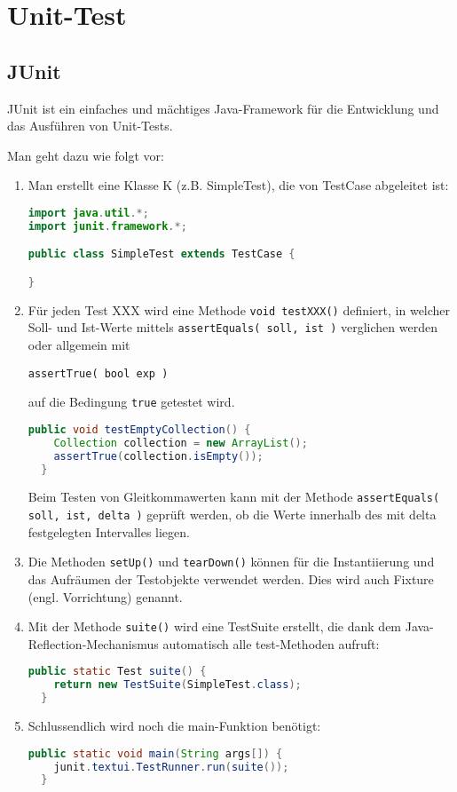 \section{Unit-Test}
\subsection{JUnit}
JUnit ist ein einfaches und mächtiges Java-Framework für die
Entwicklung und das Ausführen von Unit-Tests.

Man geht dazu wie folgt vor:
\begin{enumerate}
\item Man erstellt eine Klasse K
  (z.B. SimpleTest), die von TestCase abgeleitet
 ist:
\begin{lstlisting}[language=java]
import java.util.*;
import junit.framework.*;

public class SimpleTest extends TestCase {

}
\end{lstlisting}
\newslide
\item Für jeden Test XXX wird eine Methode \lstinline{void testXXX()}
  definiert,
  in welcher Soll- und Ist-Werte mittels \lstinline{assertEquals( soll, ist )}
   verglichen werden
  oder allgemein mit

\lstinline{assertTrue( bool exp )}

auf die Bedingung \verb+true+ getestet wird.
\begin{lstlisting}[language=java]
  public void testEmptyCollection() {
    Collection collection = new ArrayList();
    assertTrue(collection.isEmpty());
  }
 \end{lstlisting}
  Beim Testen von Gleitkommawerten kann mit der Methode
  \lstinline{assertEquals( soll, ist, delta )} geprüft werden, ob die Werte
  innerhalb des mit delta festgelegten Intervalles liegen.
\newslide
\item Die Methoden \verb|setUp()| und \verb|tearDown()|
können für die Instantiierung und das Aufräumen
  der Testobjekte verwendet werden. Dies wird auch Fixture (engl.
  Vorrichtung) genannt.
\item Mit der Methode \verb+suite()+ wird eine TestSuite erstellt,
  die dank dem Java-Reflection-Mechanismus automatisch alle test-Methoden
  aufruft:
\begin{lstlisting}[language=java]
  public static Test suite() {
    return new TestSuite(SimpleTest.class);
  }
\end{lstlisting}
\newslide
\item Schlussendlich wird noch die main-Funktion benötigt:
\begin{lstlisting}[language=java]
  public static void main(String args[]) {
    junit.textui.TestRunner.run(suite());
  }
\end{lstlisting}
\end{enumerate}
